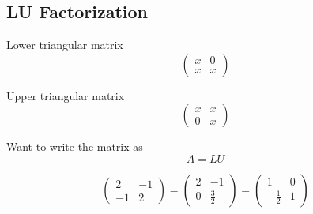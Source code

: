 \documentclass[11pt]{article}
\begin{document}
\subsection{LU Factorization} 
\begin{definition}
    Lower triangular matrix
    \[
        \begin{pmatrix}
            x & 0 \\
            x & x
        \end{pmatrix}
    \]
    
\end{definition}
\begin{definition}
    Upper triangular matrix
    \[
        \begin{pmatrix}
            x & x \\
            0 & x
        \end{pmatrix}
    \]
    
\end{definition}
Want to write the matrix as
\[
    A = LU
\]
\begin{example}
    \[\begin{pmatrix}
        2 & -1 \\
        -1 & 2
    \end{pmatrix}
    =
    \begin{pmatrix}
        2 & -1 \\
        0 & \frac{3}{2}
    \end{pmatrix}
    = 
    \begin{pmatrix}
        1 & 0 \\
        -\frac{1}{2} & 1
    \end{pmatrix}
    \] 
\end{example}
\end{document}
